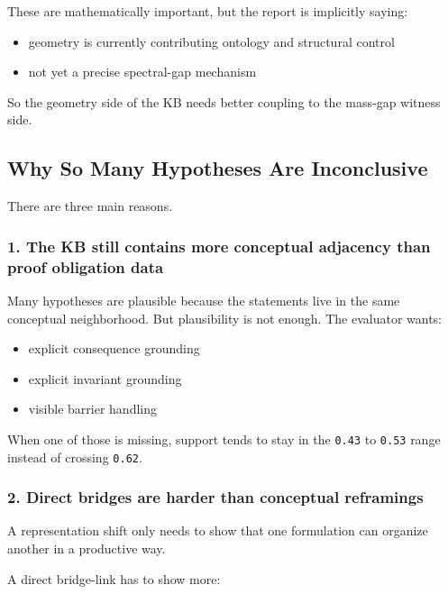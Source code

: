 \documentclass[
]{article}
\providecommand{\tightlist}{%
  \setlength{\itemsep}{0pt}\setlength{\parskip}{0pt}}
\begin{document}
These are mathematically important, but the report is implicitly saying:

\begin{itemize}
\tightlist
\item
  geometry is currently contributing ontology and structural control
\item
  not yet a precise spectral-gap mechanism
\end{itemize}

So the geometry side of the KB needs better coupling to the mass-gap
witness side.

\subsection{Why So Many Hypotheses Are
Inconclusive}\label{why-so-many-hypotheses-are-inconclusive}

There are three main reasons.

\subsubsection{1. The KB still contains more conceptual adjacency than
proof obligation
data}\label{1-the-kb-still-contains-more-conceptual-adjacency-than-proof-obligation-data}

Many hypotheses are plausible because the statements live in the same
conceptual neighborhood. But plausibility is not enough. The evaluator
wants:

\begin{itemize}
\tightlist
\item
  explicit consequence grounding
\item
  explicit invariant grounding
\item
  visible barrier handling
\end{itemize}

When one of those is missing, support tends to stay in the \texttt{0.43}
to \texttt{0.53} range instead of crossing \texttt{0.62}.

\subsubsection{2. Direct bridges are harder than conceptual
reframings}\label{2-direct-bridges-are-harder-than-conceptual-reframings}

A representation shift only needs to show that one formulation can
organize another in a productive way.

A direct bridge-link has to show more:
\end{document}
